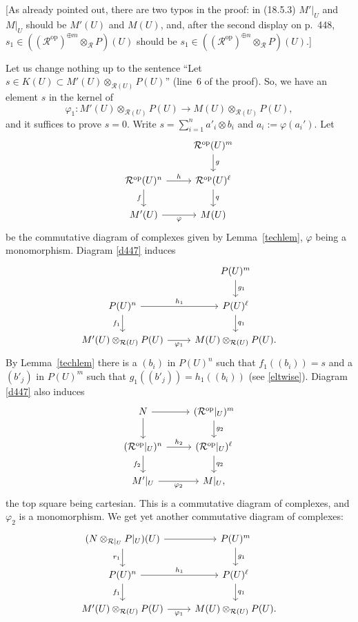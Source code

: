 \documentclass[12pt]{article}
\theoremstyle{remark}
\theoremstyle{definition}
\newcommand{\cc}{\mathcal}
\DeclareMathOperator{\op}{op}
\begin{document}
[As already pointed out, there are two typos in the proof: in (18.5.3) $M'|_U$ and $M|_U$ should be $M'(U)$ and $M(U)$, and, after the second display on p.~448, $s_1\in((\cc R^{\op})^{\oplus m}\otimes_{\cc R}P)(U)$ should be $s_1\in((\cc R^{\op})^{\oplus n}\otimes_{\cc R}P)(U)$.]

Let us change nothing up to the sentence ``Let $s\in K(U)\subset M'(U)\otimes_{\cc R(U)}P(U)$'' (line~6 of the proof). So, we have an element $s$ in the kernel of 
$$
\varphi_1:M'(U)\otimes_{\cc R(U)}P(U)\to M(U)\otimes_{\cc R(U)}P(U),
$$ 
and it suffices to prove $s=0$. Write $s=\sum_{i=1}^na'_i\otimes b_i$ and $a_i:=\varphi(a_i')$. Let
%
\begin{equation}\label{d447}
\begin{tikzcd}
{}&\cc R^{\op}(U)^m\ar{d}{g}\\ 
\cc R^{\op}(U)^n\ar{r}{h}\ar{d}[swap]{f}&\cc R^{\op}(U)^\ell\ar{d}{q}\\ 
M'(U)\ar{r}[swap]{\varphi}&M(U)
\end{tikzcd}
\end{equation}
%
be the commutative diagram of complexes given by Lemma~\ref{techlem}, $\varphi$ being a monomorphism. Diagram \eqref{d447} induces
$$
\begin{tikzcd}
{}&P(U)^m\ar{d}{g_1}\\ 
P(U)^n\ar{r}{h_1}\ar{d}[swap]{f_1}&P(U)^\ell\ar{d}{q_1}\\ 
M'(U)\otimes_{\cc R(U)}P(U)\ar{r}[swap]{\varphi_1}&M(U)\otimes_{\cc R(U)}P(U).
\end{tikzcd}
$$ 
By Lemma~\ref{techlem} there is a $(b_i)$ in $P(U)^n$ such that $f_1((b_i))=s$ and a $(b'_j)$ in $P(U)^m$ such that $g_1((b'_j))=h_1((b_i))$ (see \eqref{eltwise}). Diagram \eqref{d447} also induces
$$
\begin{tikzcd}
N\ar{r}\ar{d}&(\cc R^{\op}|_U)^m\ar{d}{g_2}\\ 
(\cc R^{\op}|_U)^n\ar{r}{h_2}\ar{d}[swap]{f_2}&(\cc R^{\op}|_U)^\ell\ar{d}{q_2}\\ 
M'|_U\ar{r}[swap]{\varphi_2}&M|_U,
\end{tikzcd}
$$ 
the top square being cartesian. This is a commutative diagram of complexes, and $\varphi_2$ is a monomorphism. We get yet another commutative diagram of complexes:
$$
\begin{tikzcd}
(N\otimes_{\cc R|_U}P|_U)(U)\ar{r}\ar{d}[swap]{r_1}&P(U)^m\ar{d}{g_1}\\ 
P(U)^n\ar{r}{h_1}\ar{d}[swap]{f_1}&P(U)^\ell\ar{d}{q_1}\\ 
M'(U)\otimes_{\cc R(U)}P(U)\ar{r}[swap]{\varphi_1}&M(U)\otimes_{\cc R(U)}P(U).
\end{tikzcd}
$$ 
\end{document}
